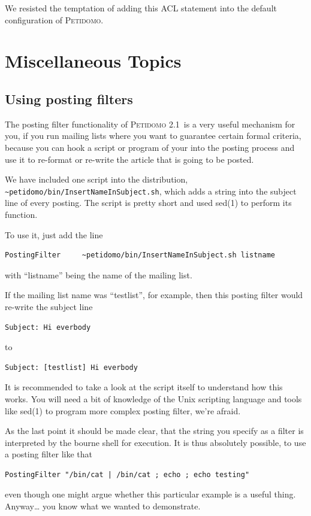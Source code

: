 \documentclass[a4paper]{report}
\newcommand{\Petidomo}{{\scshape Peti\-domo}}
\newcommand{\PetidomoTwo}{{\scshape Peti\-domo 2.1}}
\newcommand{\file}[1]{{\tt #1}}
\begin{document}
We resisted the temptation of adding this ACL statement into the
default configuration of \Petidomo.

%
\chapter{Miscellaneous Topics}
\section{Using posting filters}
\label{using posting filters}

The posting filter functionality of \PetidomoTwo\ is a very useful
mechanism for you, if you run mailing lists where you want to
guarantee certain formal criteria, because you can hook a script or
program of your into the posting process and use it to re-format or
re-write the article that is going to be posted.

 We have included one
script into the distribution,
\file{\~{}peti\-domo/bin/Insert\-Name\-In\-Subject.sh}, which adds a string
into the subject line of every posting. The script is pretty short and
used sed(1) to perform its function.

To use it, just add the line
\begin{verbatim}
PostingFilter     ~petidomo/bin/InsertNameInSubject.sh listname
\end{verbatim}
with ``listname'' being the name of the mailing list.

If the mailing list name was ``testlist'', for example, then this
posting filter would re-write the subject line
\begin{verbatim}
Subject: Hi everbody
\end{verbatim}
to
\begin{verbatim}
Subject: [testlist] Hi everbody
\end{verbatim}

It is recommended to take a look at the script itself to understand
how this works. You will need a bit of knowledge of the Unix scripting
language and tools like sed(1) to program more complex posting filter,
we're afraid.

As the last point it should be made clear, that the string you specify
as a filter is interpreted by the bourne shell for execution. It is
thus absolutely possible, to use a posting filter like that
\begin{verbatim}
PostingFilter "/bin/cat | /bin/cat ; echo ; echo testing"
\end{verbatim}
even though one might argue whether this particular example is a
useful thing. Anyway\dots{} you know what we wanted to demonstrate.
\end{document}

